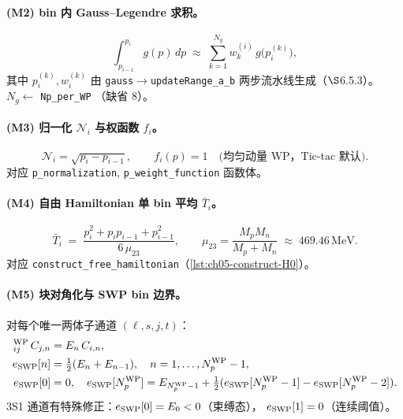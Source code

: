 \paragraph{(M2) bin 内 Gauss--Legendre 求积。}
\begin{equation}
\label{eq:ch06-GL-quadrature}
\int_{p_{i-1}}^{p_i} g(p)\,dp
\;\approx\;
\sum_{k=1}^{N_g} w_k^{(i)}\, g\!\bigl(p^{(k)}_i\bigr),
\end{equation}
其中 \(p^{(k)}_i, w^{(k)}_i\) 由 \texttt{gauss}\(\to\)\texttt{updateRange\_a\_b}
两步流水线生成（\(\S\)6.5.3）。\(N_g \leftarrow\) \texttt{Np\_per\_WP}
（缺省 8）。

\paragraph{(M3) 归一化 \(\mathcal{N}_i\) 与权函数 \(f_i\)。}
\begin{equation}
\label{eq:ch06-Ni-fi}
\mathcal{N}_i = \sqrt{p_i - p_{i-1}},
\qquad
f_i(p) = 1
\quad
\text{(均匀动量 WP，Tic-tac 默认)}.
\end{equation}
对应 \texttt{p\_normalization}, \texttt{p\_weight\_function} 函数体。

\paragraph{(M4) 自由 Hamiltonian 单 bin 平均 \(\bar{T}_i\)。}
\begin{equation}
\label{eq:ch06-Tbar-code}
\bar{T}_i \;=\; \frac{p_i^2 + p_i p_{i-1} + p_{i-1}^2}{6\,\mu_{23}},
\qquad
\mu_{23} = \frac{M_p M_n}{M_p + M_n} \;\approx\; 469.46\,\mathrm{MeV}.
\end{equation}
对应 \texttt{construct\_free\_hamiltonian}（\cref{lst:ch05-construct-H0}）。

\paragraph{(M5) 块对角化与 SWP bin 边界。}
对每个唯一两体子通道 \((\ell, s, j, t)\)：
\begin{align}
[H_0 + V]_{ij}^{\rm WP}\,C_{j,n} &= E_n\,C_{i,n}, \label{eq:ch06-eigsys}\\
e_{\rm SWP}[n] &= \tfrac{1}{2}(E_n + E_{n-1}),\quad n = 1, \ldots, \NpWP-1, \label{eq:ch06-eSWP}\\
e_{\rm SWP}[0] &= 0,\quad e_{\rm SWP}[\NpWP] = E_{\NpWP-1} + \tfrac{1}{2}(e_{\rm SWP}[\NpWP-1] - e_{\rm SWP}[\NpWP-2]). \label{eq:ch06-eSWP-end}
\end{align}
3S1 通道有特殊修正：\(e_{\rm SWP}[0] = E_0 < 0\)（束缚态），
\(e_{\rm SWP}[1] = 0\)（连续阈值）。

